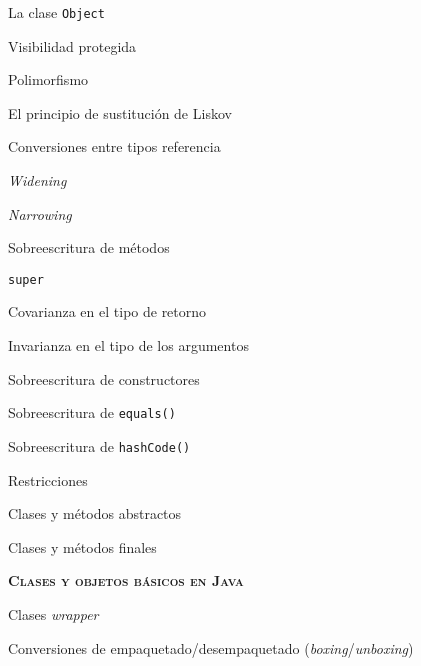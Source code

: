 \begin{longenum}
\begin{longenum}
\begin{longenum}
            \item La clase \texttt{Object}
            \item Visibilidad protegida
        \end{longenum}
        \item Polimorfismo
        \begin{longenum}
            \item El principio de sustitución de Liskov
            \item Conversiones entre tipos referencia
            \begin{longenum}
                \item \textit{Widening}
                \item \textit{Narrowing}
            \end{longenum}
            \item Sobreescritura de métodos
            \begin{longenum}
                \item \texttt{super}
                \item Covarianza en el tipo de retorno
                \item Invarianza en el tipo de los argumentos
                \item Sobreescritura de constructores
                \item Sobreescritura de \texttt{equals()}
                \item Sobreescritura de \texttt{hashCode()}
            \end{longenum}
        \end{longenum}
        \item Restricciones
        \begin{longenum}
            \item Clases y métodos abstractos
            \item Clases y métodos finales
        \end{longenum}
    \end{longenum}
    \item \textbf{\textsc{Clases y objetos básicos en Java}}
    \begin{longenum}
        \item Clases \textit{wrapper}
        \begin{longenum}
            \item Conversiones de empaquetado/desempaquetado (\textit{boxing}/\textit{unboxing})
        \end{longenum}

\end{longenum}
\end{longenum}
